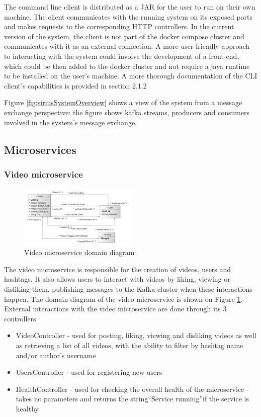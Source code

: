 \documentclass[parskip=full]{article}
\begin{document}
    The command line client is distributed as a JAR for the user to run on their own machine.
    The client communicates with the running system on its exposed ports and makes requests to the corresponding HTTP controllers.
    In the current version of the system, the client is not part of the docker compose cluster and communicates with it as an external connection.
    A more user-friendly approach to interacting with the system could involve the development of a front-end, which could be then added to the docker cluster and not require a java runtime to be installed on the user's machine.
    A more thorough documentation of the CLI client's capabilities is provided in section 2.1.2

    Figure \ref{fig:siriusSystemOverview} shows a view of the system from a message exchange perspective: the figure shows kafka streams, producers and consumers involved in the system's message exchange.

    \pagebreak
    \subsection{Microservices}
    \subsubsection{Video microservice}

    \begin{figure}
        \includegraphics[width=0.5\textwidth]{vm-domain-diagram}
        \caption{Video microservice domain diagram}
        \label{fig:vmDomain}
    \end{figure}
    The video microservice is responsible for the creation of videos, users and hashtags.
    It also allows users to interact with videos by liking, viewing or disliking them, publishing messages to the Kafka cluster when these interactions happen.
    The domain diagram of the video microservice is shown on Figure \ref{fig:vmDomain}.
    External interactions with the video microservice are done through its 3 controllers

    \begin{itemize}
        \item VideoController - used for posting, liking, viewing and disliking videos as well as retrieving a list of all videos, with the ability to filter by hashtag name and/or author's username
        \item UsersController - used for registering new users
        \item HealthController - used for checking the overall health of the microservice - takes no parameters and returns the string``Service running''if the service is healthy
    \end{itemize}
\end{document}
